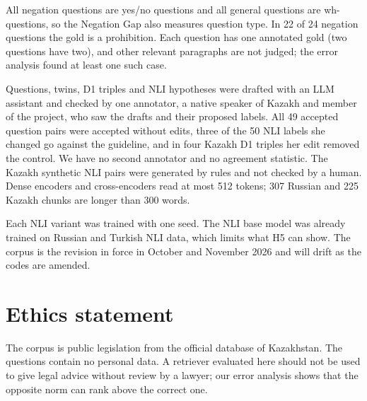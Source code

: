 \documentclass[11pt]{article}
\begin{document}
All negation questions are yes/no questions and all general questions are wh-questions, so the Negation Gap
also measures question type. In 22 of 24 negation questions the gold is a prohibition. Each question has one
annotated gold (two questions have two), and other relevant paragraphs are not judged; the error analysis found
at least one such case.

Questions, twins, D1 triples and NLI hypotheses were drafted with an LLM assistant and checked by one annotator,
a native speaker of Kazakh and member of the project, who saw the drafts and their proposed labels. All 49
accepted question pairs were accepted without edits, three of the 50 NLI labels she changed go against the
guideline, and in four Kazakh D1 triples her edit removed the control. We have no second annotator and no
agreement statistic. The Kazakh synthetic NLI pairs were generated by rules and not checked by a human.
Dense encoders and cross-encoders read at most 512 tokens; 307 Russian and 225 Kazakh chunks are longer than
300 words.

Each NLI variant was trained with one seed. The NLI base model was already trained on Russian and Turkish NLI
data, which limits what H5 can show. The corpus is the revision in force in October and November 2026 and will
drift as the codes are amended.

\section*{Ethics statement}

The corpus is public legislation from the official database of Kazakhstan. The questions contain no personal
data. A retriever evaluated here should not be used to give legal advice without review by a lawyer; our error
analysis shows that the opposite norm can rank above the correct one.


\end{document}
